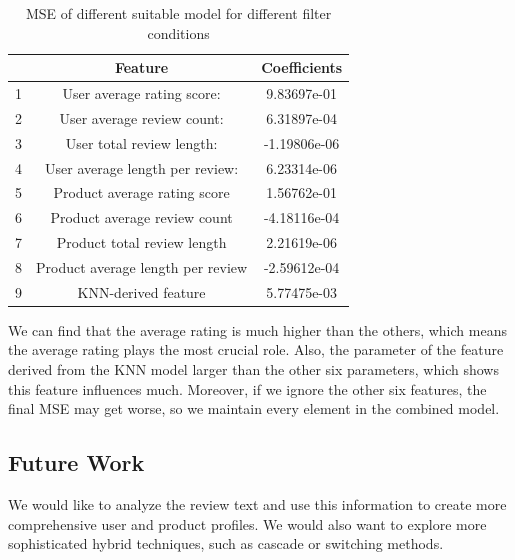 \documentclass[sigconf]{acmart}
\begin{document}
\begin{table}[h]
  \centering
  \caption{MSE of different suitable model for different filter conditions}
  \label{tab:coef}
  \begin{tabular}{c|c|c}
    \toprule
    & Feature & Coefficients  \\
    \midrule
    1 & User average rating score: & 9.83697e-01 \\
    2 & User average review count: & 6.31897e-04\\
    3 & User total review length: & -1.19806e-06\\
    4 & User average length per review: & 6.23314e-06\\
    5 & Product average rating score& 1.56762e-01\\
    6 & Product average review count& -4.18116e-04\\
    7 & Product total review length& 2.21619e-06\\
    8 & Product average length per review& -2.59612e-04\\
    9 & KNN-derived feature & 5.77475e-03\\
  \bottomrule
\end{tabular}
\end{table}

We can find that the average rating is much higher than the others, which means the average rating plays the most crucial role. Also, the parameter of the feature derived from the KNN model larger than the other six parameters, which shows this feature influences much. Moreover, if we ignore the other six features, the final MSE may get worse, so we maintain every element in the combined model.

\subsection{Future Work}
We would like to analyze the review text and use this information to create more comprehensive user and product profiles. We would also want to explore more sophisticated hybrid techniques, such as cascade or switching methods.



\end{document}
